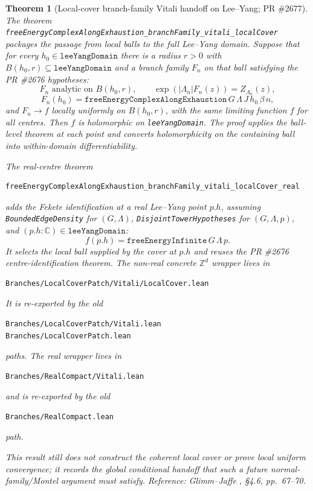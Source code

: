 \documentclass[a4paper,11pt]{article}
\newtheorem{theorem}{Theorem}
\begin{document}
\begin{theorem}[Local-cover branch-family Vitali handoff on Lee--Yang; PR \#2677]
The theorem
\texttt{freeEnergyComplexAlongExhaustion\_branchFamily\_vitali\_localCover}
packages the passage from local balls to the full Lee--Yang domain.  Suppose
that for every $h_0\in\texttt{leeYangDomain}$ there is a radius $r>0$ with
$B(h_0,r)\subseteq\texttt{leeYangDomain}$ and a branch family $F_n$ on that
ball satisfying the PR \#2676 hypotheses:
\[
  F_n\text{ analytic on }B(h_0,r),\qquad
  \exp(|\Lambda_n|F_n(z))=Z_{\Lambda_n}(z),
\]
\[
  F_n(h_0)=
  \texttt{freeEnergyComplexAlongExhaustion}\,G\,\Lambda\,J\,h_0\,\beta\,n,
\]
and $F_n\to f$ locally uniformly on $B(h_0,r)$, with the same limiting
function $f$ for all centres.  Then $f$ is holomorphic on
\texttt{leeYangDomain}.  The proof applies the ball-level theorem at each
point and converts holomorphicity on the containing ball into
within-domain differentiability.

The real-centre theorem
\begin{Verbatim}[breaklines=true,breakanywhere=true]
freeEnergyComplexAlongExhaustion_branchFamily_vitali_localCover_real
\end{Verbatim}
adds the Fekete identification at a real Lee--Yang point $p.h$, assuming
\texttt{BoundedEdgeDensity} for $(G,\Lambda)$,
\texttt{DisjointTowerHypotheses} for $(G,\Lambda,p)$, and
$(p.h:\mathbb C)\in\texttt{leeYangDomain}$:
\[
  f(p.h)=\texttt{freeEnergyInfinite}\,G\,\Lambda\,p .
\]
It selects the local ball supplied by the cover at $p.h$ and reuses the
PR \#2676 centre-identification theorem.  The non-real concrete $\mathbb Z^d$
wrapper lives in
\begin{Verbatim}[breaklines=true,breakanywhere=true]
Branches/LocalCoverPatch/Vitali/LocalCover.lean
\end{Verbatim}
It is re-exported by the old
\begin{Verbatim}[breaklines=true,breakanywhere=true]
Branches/LocalCoverPatch/Vitali.lean
Branches/LocalCoverPatch.lean
\end{Verbatim}
paths.  The real wrapper lives in
\begin{Verbatim}[breaklines=true,breakanywhere=true]
Branches/RealCompact/Vitali.lean
\end{Verbatim}
and is re-exported by the old
\begin{Verbatim}[breaklines=true,breakanywhere=true]
Branches/RealCompact.lean
\end{Verbatim}
path.

This result still does not construct the coherent local cover or prove local
uniform convergence; it records the global conditional handoff that such a
future normal-family/Montel argument must satisfy.
Reference: Glimm--Jaffe \cite{glimm-jaffe}, \S 4.6, pp.~67--70.
\end{theorem}
\end{document}

